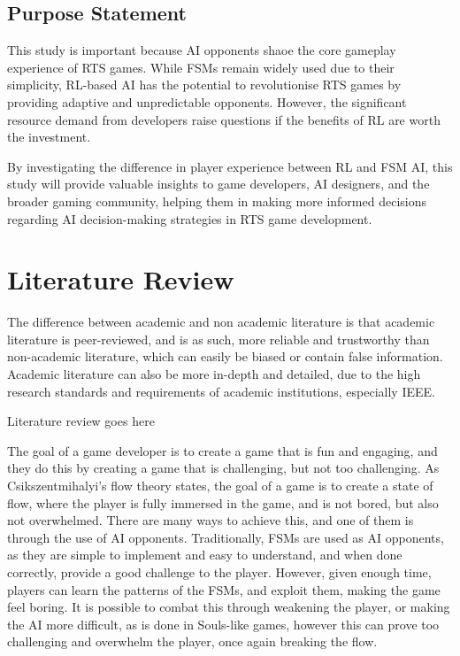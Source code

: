 \documentclass[conference]{IEEEtran}
\begin{document}
\subsection{Purpose Statement}

This study is important because AI opponents shaoe the core gameplay experience of RTS games. While FSMs remain widely used due to their simplicity, RL-based AI has the potential to revolutionise
RTS games by providing adaptive and unpredictable opponents. However, the significant resource demand from developers raise questions if the benefits of RL are worth the investment.

By investigating the difference in player experience between RL and FSM AI, this study will provide valuable insights to game developers, AI designers, and the broader gaming community, helping them
in making more informed decisions regarding AI decision-making strategies in RTS game development.

\section{Literature Review}

The difference between academic and non academic literature is that academic literature is peer-reviewed, and is as such, more reliable and trustworthy
than non-academic literature, which can easily be biased or contain false information. Academic literature can also be more in-depth and detailed, due to
the high research standards and requirements of academic institutions, especially IEEE.


Literature review goes here


The goal of a game developer is to create a game that is fun and engaging, and they do this by creating a game that is challenging, but not too challenging.
As Csikszentmihalyi's flow theory states, the goal of a game is to create a state of flow, where the player is fully immersed in the game, and is not
bored, but also not overwhelmed. There are many ways to achieve this, and one of them is through the use of AI opponents. Traditionally, FSMs are
used as AI opponents, as they are simple to implement and easy to understand, and when done correctly, provide a good challenge to the player.
However, given enough time, players can learn the patterns of the FSMs, and exploit them, making the game feel boring. It is possible to combat this
through weakening the player, or making the AI more difficult, as is done in Souls-like games, however this can prove too challenging and overwhelm the player,
once again breaking the flow.
\end{document}
